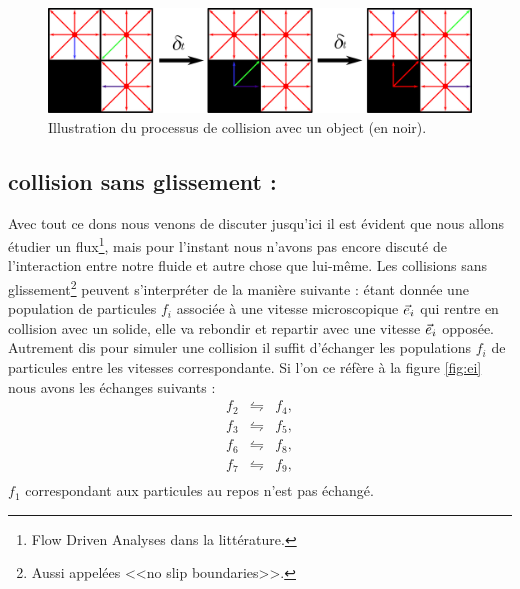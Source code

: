     \begin{figure}[hbtp]
      \centering
      \includegraphics[width=\linewidth]{Fig/collide.pdf}
      \caption{Illustration du processus de collision avec un object (en noir).}
    \end{figure}     
    \subsection{\bf collision sans glissement :}

      Avec tout ce dons nous venons de discuter jusqu'ici il est évident que nous allons étudier un flux\footnote{Flow 
      Driven Analyses dans la littérature.}, mais pour l'instant nous n'avons pas encore discuté de l'interaction entre
      notre fluide et autre chose que lui-même.
      Les collisions sans glissement\footnote{Aussi appelées <<no slip boundaries>>.} peuvent s'interpréter de la 
      manière suivante : étant donnée une population de particules $f_i$ associée à une vitesse microscopique $\vec{e}_i$ qui 
      rentre en collision avec un solide, elle va rebondir et repartir avec une vitesse $\vec{e}_i$ opposée.
      Autrement dis pour simuler une collision il suffit d'échanger les populations $f_i$ de particules entre les 
      vitesses correspondante.
      Si l'on ce réfère à la figure \ref{fig:ei} nous avons les échanges suivants :
      \begin{equation}     
        \begin{array}{rcr}
          f_2 & \leftrightharpoons & f_4,\\
          f_3 & \leftrightharpoons & f_5,\\
          f_6 & \leftrightharpoons & f_8,\\
          f_7 & \leftrightharpoons & f_9,\\
        \end{array}
      \end{equation}
      $f_1$ correspondant aux particules au repos n'est pas échangé.
      

      
      